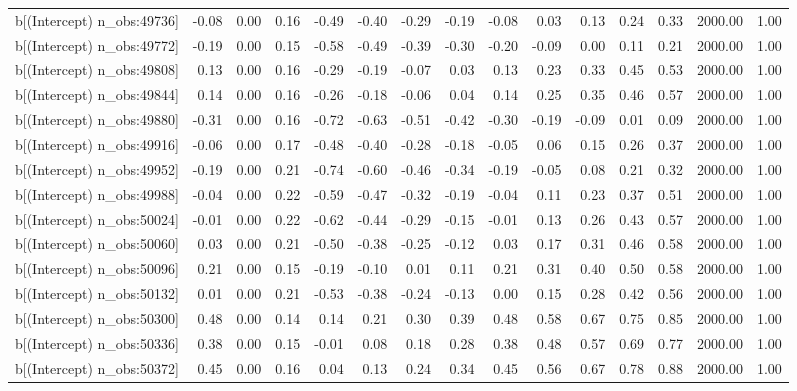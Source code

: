 \begin{table}[ht]
\begin{tabular}{rrrrrrrrrrrrrrr}
  b[(Intercept) n\_obs:49736] & -0.08 & 0.00 & 0.16 & -0.49 & -0.40 & -0.29 & -0.19 & -0.08 & 0.03 & 0.13 & 0.24 & 0.33 & 2000.00 & 1.00 \\ 
  b[(Intercept) n\_obs:49772] & -0.19 & 0.00 & 0.15 & -0.58 & -0.49 & -0.39 & -0.30 & -0.20 & -0.09 & 0.00 & 0.11 & 0.21 & 2000.00 & 1.00 \\ 
  b[(Intercept) n\_obs:49808] & 0.13 & 0.00 & 0.16 & -0.29 & -0.19 & -0.07 & 0.03 & 0.13 & 0.23 & 0.33 & 0.45 & 0.53 & 2000.00 & 1.00 \\ 
  b[(Intercept) n\_obs:49844] & 0.14 & 0.00 & 0.16 & -0.26 & -0.18 & -0.06 & 0.04 & 0.14 & 0.25 & 0.35 & 0.46 & 0.57 & 2000.00 & 1.00 \\ 
  b[(Intercept) n\_obs:49880] & -0.31 & 0.00 & 0.16 & -0.72 & -0.63 & -0.51 & -0.42 & -0.30 & -0.19 & -0.09 & 0.01 & 0.09 & 2000.00 & 1.00 \\ 
  b[(Intercept) n\_obs:49916] & -0.06 & 0.00 & 0.17 & -0.48 & -0.40 & -0.28 & -0.18 & -0.05 & 0.06 & 0.15 & 0.26 & 0.37 & 2000.00 & 1.00 \\ 
  b[(Intercept) n\_obs:49952] & -0.19 & 0.00 & 0.21 & -0.74 & -0.60 & -0.46 & -0.34 & -0.19 & -0.05 & 0.08 & 0.21 & 0.32 & 2000.00 & 1.00 \\ 
  b[(Intercept) n\_obs:49988] & -0.04 & 0.00 & 0.22 & -0.59 & -0.47 & -0.32 & -0.19 & -0.04 & 0.11 & 0.23 & 0.37 & 0.51 & 2000.00 & 1.00 \\ 
  b[(Intercept) n\_obs:50024] & -0.01 & 0.00 & 0.22 & -0.62 & -0.44 & -0.29 & -0.15 & -0.01 & 0.13 & 0.26 & 0.43 & 0.57 & 2000.00 & 1.00 \\ 
  b[(Intercept) n\_obs:50060] & 0.03 & 0.00 & 0.21 & -0.50 & -0.38 & -0.25 & -0.12 & 0.03 & 0.17 & 0.31 & 0.46 & 0.58 & 2000.00 & 1.00 \\ 
  b[(Intercept) n\_obs:50096] & 0.21 & 0.00 & 0.15 & -0.19 & -0.10 & 0.01 & 0.11 & 0.21 & 0.31 & 0.40 & 0.50 & 0.58 & 2000.00 & 1.00 \\ 
  b[(Intercept) n\_obs:50132] & 0.01 & 0.00 & 0.21 & -0.53 & -0.38 & -0.24 & -0.13 & 0.00 & 0.15 & 0.28 & 0.42 & 0.56 & 2000.00 & 1.00 \\ 
  b[(Intercept) n\_obs:50300] & 0.48 & 0.00 & 0.14 & 0.14 & 0.21 & 0.30 & 0.39 & 0.48 & 0.58 & 0.67 & 0.75 & 0.85 & 2000.00 & 1.00 \\ 
  b[(Intercept) n\_obs:50336] & 0.38 & 0.00 & 0.15 & -0.01 & 0.08 & 0.18 & 0.28 & 0.38 & 0.48 & 0.57 & 0.69 & 0.77 & 2000.00 & 1.00 \\ 
  b[(Intercept) n\_obs:50372] & 0.45 & 0.00 & 0.16 & 0.04 & 0.13 & 0.24 & 0.34 & 0.45 & 0.56 & 0.67 & 0.78 & 0.88 & 2000.00 & 1.00 \\ 

\end{tabular}
\end{table}
